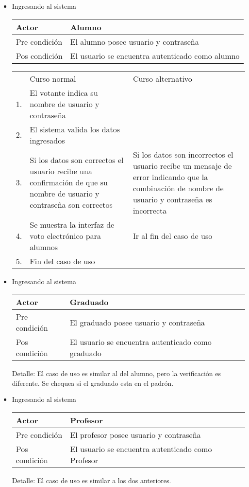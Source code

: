 \begin{itemize}

\bigskip
\item Ingresando al sistema
\bigskip
\begin{center}
\begin{tabular}{ll}
Actor & Alumno \\
\hline
Pre condición & El alumno posee usuario y contraseña \\
\hline
Pos condición & El usuario se encuentra autenticado como alumno\\
\hline
\end{tabular}
\medskip
\begin{tabular}{c p{4cm}|p{4cm}}
 & Curso normal & Curso alternativo \\
 1. & El votante indica su nombre de usuario y contraseña &  \\
 2. & El sistema valida los datos ingresados & \\
 3. & Si los datos son correctos el usuario recibe una confirmación de que su nombre de usuario y contraseña son correctos & Si los datos son incorrectos el usuario recibe un mensaje de error indicando que la combinación de nombre de usuario y contraseña es incorrecta \\
 4. & Se muestra la interfaz de voto electrónico para alumnos & Ir al fin del caso de uso \\
 5. & Fin del caso de uso& \\ 
\end{tabular}
\end{center}

\bigskip
\item Ingresando al sistema
\bigskip
\begin{center}
\begin{tabular}{ll}
Actor & Graduado \\
\hline
Pre condición & El graduado posee usuario y contraseña \\
\hline
Pos condición & El usuario se encuentra autenticado como graduado\\
\hline
\end{tabular}
Detalle: El caso de uso es similar al del alumno, pero la verificación es diferente. Se chequea si el graduado esta en el padrón.
\end{center}

\bigskip
\item Ingresando al sistema
\bigskip
\begin{center}
\begin{tabular}{ll}
Actor & Profesor \\
\hline
Pre condición & El profesor posee usuario y contraseña \\
\hline
Pos condición & El usuario se encuentra autenticado como Profesor\\
\hline
\end{tabular}
Detalle: El caso de uso es similar a los dos anteriores.
\end{center}



\end{itemize}
